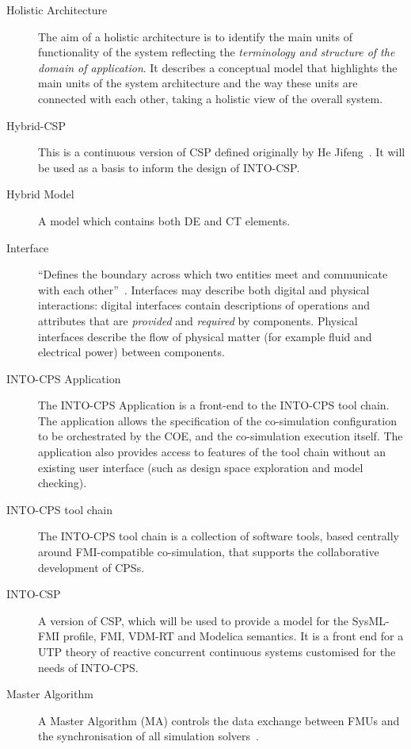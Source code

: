 \begin{description}
\item[Holistic Architecture] The aim of a holistic architecture is to identify the main units of functionality of the system reflecting the \emph{terminology and structure of the domain of application}. It describes a conceptual model that highlights the main units of the system architecture and the way these units are connected with each other, taking a holistic view of the overall system.

\item[Hybrid-CSP] This is a continuous version of CSP defined originally by He Jifeng~\cite{Jifeng94}. It will be used as a basis to inform the design of INTO-CSP.

\item[Hybrid Model] A model which contains both DE and CT elements.

\item[Interface] ``Defines the boundary across which two entities meet and communicate with each other''~\cite{Holt&14}. Interfaces may describe both digital and physical interactions: digital interfaces  contain descriptions of operations and attributes that are \emph{provided} and \emph{required} by components. Physical interfaces describe the flow of physical matter (for example fluid and electrical power) between components.

\item[INTO-CPS Application] The INTO-CPS Application is a front-end to the INTO-CPS tool chain. The application allows the specification of the co-simulation configuration to be orchestrated by the COE, and the co-simulation execution itself. The application also provides access to features of the tool chain without an existing user interface (such as design space exploration and model checking).

\item[INTO-CPS tool chain] The INTO-CPS tool chain is a collection of software tools, based centrally around FMI-compatible co-simulation, that supports the collaborative development of CPSs.

\item[INTO-CSP] A version of CSP, which will be used to provide a model for the SysML-FMI profile, FMI, VDM-RT and Modelica semantics. It is a front end for a UTP theory of reactive concurrent continuous systems customised for the needs of INTO-CPS.

\item[Master Algorithm] A Master Algorithm (MA) controls the data exchange between FMUs and the synchronisation of all simulation solvers~\cite{FMIStandard2.0}.


\end{description}
